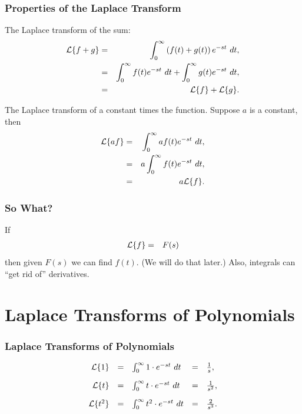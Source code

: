 \begin{frame}
  \frametitle{Properties of the Laplace Transform}

  The Laplace transform of the sum:
  \begin{eqnarray*}
    \laplace{f+g} & = & \int^\infty_0 \lp f(t) + g(t) \rp e^{-st} ~ dt, \\
    & = & \int^\infty_0 f(t) e^{-st} ~ dt + \int^\infty_0 g(t) e^{-st} ~ dt, \\
    & = & \laplace{f} + \laplace{g}.
  \end{eqnarray*}

  
  The Laplace transform of a constant times the function. Suppose $a$ is a constant, then
  \begin{eqnarray*}
    \laplace{a f} & = & \int^\infty_0 a f(t) e^{-st} ~ dt, \\
    & = & a \int^\infty_0 f(t) e^{-st} ~ dt, \\
    & = & a \laplace{f}.
  \end{eqnarray*}


\end{frame}


\begin{frame}
  \frametitle{So What?}

  If 
  \begin{eqnarray*}
    \laplace{f} & = & F(s)
  \end{eqnarray*}
  then given $F(s)$ we can find $f(t)$. (We will do that later.) Also,
  integrals can ``get rid of'' derivatives.

\end{frame}

\section{Laplace Transforms of Polynomials}

\begin{frame}
  \frametitle{Laplace Transforms of Polynomials}

  \begin{eqnarray*}
    \begin{array}{rcl@{\hspace{1em}}c@{\hspace{1em}}l}
    \laplace{1} & = & \int^\infty_0 1 \cdot e^{-st} ~ dt
    & = & \frac{1}{s}, \\ [10pt]
    \laplace{t} & = & \int^\infty_0 t \cdot e^{-st} ~ dt
    & = & \frac{1}{s^2}, \\ [10pt]
    \laplace{t^2} & = & \int^\infty_0 t^2 \cdot e^{-st} ~ dt
    & = & \frac{2}{s^3}.      
    \end{array}
  \end{eqnarray*}

\end{frame}


